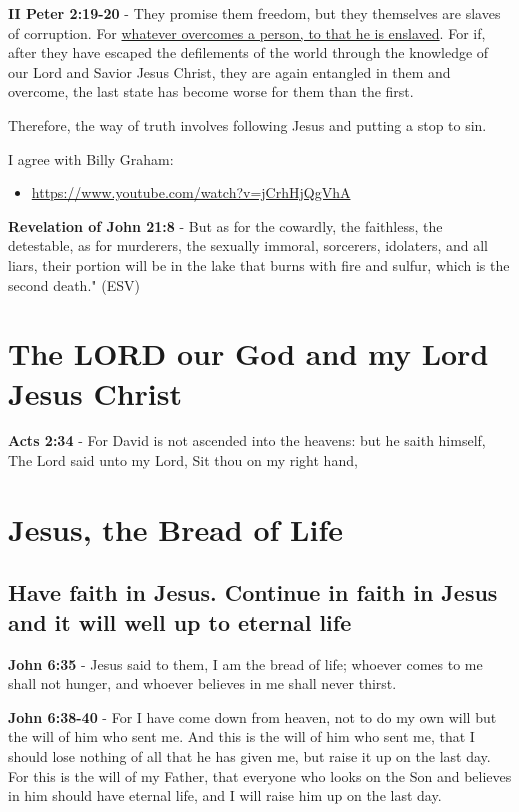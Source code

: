 \documentclass[11pt]{article}
\begin{document}
\textbf{II Peter 2:19-20} - They promise them freedom, but they themselves are slaves of corruption. For \uline{whatever overcomes a person, to that he is enslaved}. For if, after they have escaped the defilements of the world through the knowledge of our Lord and Savior Jesus Christ, they are again entangled in them and overcome, the last state has become worse for them than the first.

Therefore, the way of truth involves following Jesus and putting a stop to sin.

I agree with Billy Graham:
\begin{itemize}
\item \url{https://www.youtube.com/watch?v=jCrhHjQgVhA}
\end{itemize}

\textbf{Revelation of John 21:8} - But as for the cowardly, the faithless, the detestable, as for murderers, the sexually immoral, sorcerers, idolaters, and all liars, their portion will be in the lake that burns with fire and sulfur, which is the second death." (ESV)

\section{The LORD our God and my Lord Jesus Christ}
\label{sec:org864fb56}
\textbf{Acts 2:34} - For David is not ascended into the heavens: but he saith himself, The Lord said unto my Lord, Sit thou on my right hand,

\section{Jesus, the Bread of Life}
\label{sec:org52fa457}
\subsection{Have faith in Jesus. Continue in faith in Jesus and it will well up to eternal life}
\label{sec:org7a2916d}
\textbf{John 6:35} - Jesus said to them, I am the bread of life; whoever comes to me shall not hunger, and whoever believes in me shall never thirst.

\textbf{John 6:38-40} - For I have come down from heaven, not to do my own will but the will of him who sent me. And this is the will of him who sent me, that I should lose nothing of all that he has given me, but raise it up on the last day. For this is the will of my Father, that everyone who looks on the Son and believes in him should have eternal life, and I will raise him up on the last day.
\end{document}
